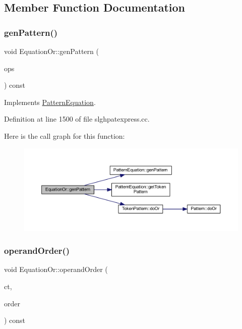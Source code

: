 \subsection{Member Function Documentation}
\mbox{\label{class_equation_or_a6fe7cf006e7c2f0861ee6cce846f9feb}} 
\subsubsection{\texorpdfstring{genPattern()}{genPattern()}}
{\footnotesize\ttfamily void Equation\+Or\+::gen\+Pattern (\begin{DoxyParamCaption}\item[{const vector$<$ \mbox{\hyperlink{class_token_pattern}{Token\+Pattern}} $>$ \&}]{ops }\end{DoxyParamCaption}) const\hspace{0.3cm}{\ttfamily [virtual]}}



Implements \mbox{\hyperlink{class_pattern_equation_a9838e5bfe5b6013c99567628a6364bfd}{Pattern\+Equation}}.



Definition at line 1500 of file slghpatexpress.\+cc.

Here is the call graph for this function\+:
\nopagebreak
\begin{figure}[H]
\begin{center}
\leavevmode
\includegraphics[width=350pt]{class_equation_or_a6fe7cf006e7c2f0861ee6cce846f9feb_cgraph}
\end{center}
\end{figure}
\mbox{\label{class_equation_or_a03a072384883e49f46825d1227872189}} 
\subsubsection{\texorpdfstring{operandOrder()}{operandOrder()}}
{\footnotesize\ttfamily void Equation\+Or\+::operand\+Order (\begin{DoxyParamCaption}\item[{\mbox{\hyperlink{class_constructor}{Constructor}} $\ast$}]{ct,  }\item[{vector$<$ \mbox{\hyperlink{class_operand_symbol}{Operand\+Symbol}} $\ast$ $>$ \&}]{order }\end{DoxyParamCaption}) const\hspace{0.3cm}{\ttfamily [virtual]}}



